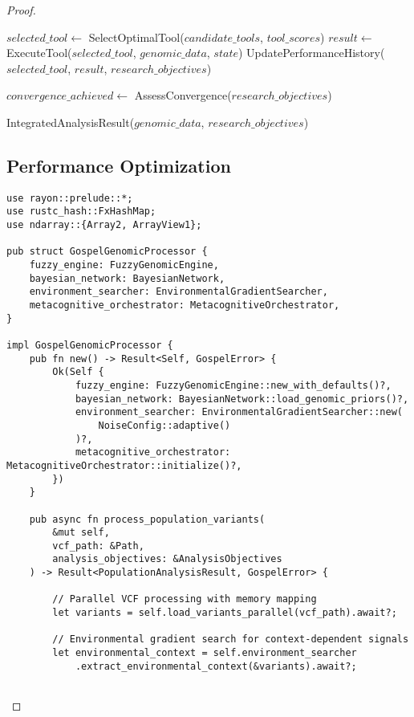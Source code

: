 \documentclass[12pt,a4paper]{article}
\begin{document}
\begin{proof}
\begin{algorithm}
\begin{algorithmic}
            \State $selected\_tool \gets$ SelectOptimalTool($candidate\_tools$, $tool\_scores$)
            \State $result \gets$ ExecuteTool($selected\_tool$, $genomic\_data$, $state$)
            \State UpdatePerformanceHistory($selected\_tool$, $result$, $research\_objectives$)
        \EndFor
        
        \State $convergence\_achieved \gets$ AssessConvergence($research\_objectives$)
    \EndWhile
    
    \State \Return IntegratedAnalysisResult($genomic\_data$, $research\_objectives$)
\EndProcedure
\end{algorithmic}
\end{algorithm}

\subsection{Performance Optimization}

\begin{lstlisting}[style=ruststyle, caption=High-Performance Genomic Processing Core]
use rayon::prelude::*;
use rustc_hash::FxHashMap;
use ndarray::{Array2, ArrayView1};

pub struct GospelGenomicProcessor {
    fuzzy_engine: FuzzyGenomicEngine,
    bayesian_network: BayesianNetwork,
    environment_searcher: EnvironmentalGradientSearcher,
    metacognitive_orchestrator: MetacognitiveOrchestrator,
}

impl GospelGenomicProcessor {
    pub fn new() -> Result<Self, GospelError> {
        Ok(Self {
            fuzzy_engine: FuzzyGenomicEngine::new_with_defaults()?,
            bayesian_network: BayesianNetwork::load_genomic_priors()?,
            environment_searcher: EnvironmentalGradientSearcher::new(
                NoiseConfig::adaptive()
            )?,
            metacognitive_orchestrator: MetacognitiveOrchestrator::initialize()?,
        })
    }
    
    pub async fn process_population_variants(
        &mut self, 
        vcf_path: &Path,
        analysis_objectives: &AnalysisObjectives
    ) -> Result<PopulationAnalysisResult, GospelError> {
        
        // Parallel VCF processing with memory mapping
        let variants = self.load_variants_parallel(vcf_path).await?;
        
        // Environmental gradient search for context-dependent signals
        let environmental_context = self.environment_searcher
            .extract_environmental_context(&variants).await?;
        

\end{lstlisting}
\end{proof}
\end{document}
